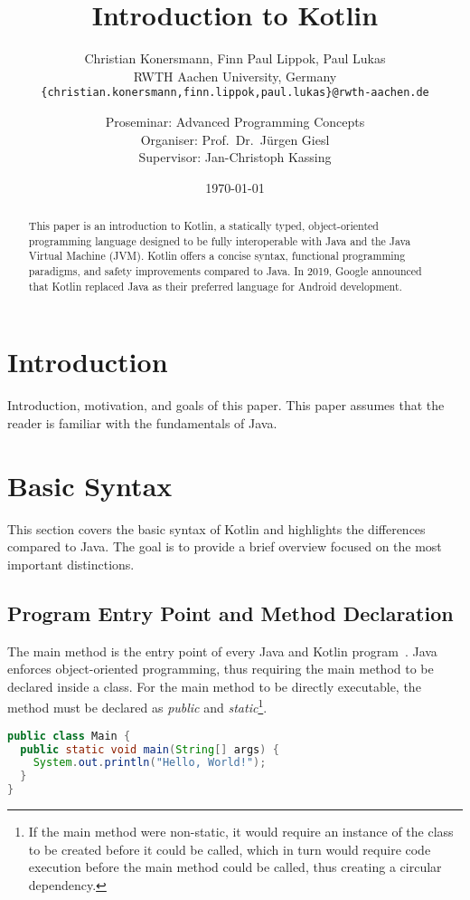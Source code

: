 \documentclass[a4paper, 11pt]{article}
\title{\huge \bfseries Introduction to Kotlin}
\author{
  Christian Konersmann, Finn Paul Lippok, Paul Lukas \\[1ex]
  RWTH Aachen University, Germany \\
  \texttt{\{christian.konersmann,finn.lippok,paul.lukas\}@rwth-aachen.de} \\
  \and
  Proseminar: Advanced Programming Concepts \\
  Organiser: Prof.\ Dr.\ Jürgen Giesl \\
  Supervisor: Jan-Christoph Kassing
}
\date{\today}
\begin{document}
\maketitle

\begin{abstract}
  This paper is an introduction to Kotlin, a statically typed, object-oriented programming language designed to be fully interoperable with Java and the Java Virtual Machine (JVM).
  Kotlin offers a concise syntax, functional programming paradigms, and safety improvements compared to Java. In 2019, Google announced that Kotlin replaced Java as their preferred language for Android development.
\end{abstract}

\section{Introduction}
  Introduction, motivation, and goals of this paper.
  This paper assumes that the reader is familiar with the fundamentals of Java.
\section{Basic Syntax}
This section covers the basic syntax of Kotlin and highlights the differences compared to Java.
The goal is to provide a brief overview focused on the most important distinctions.

\subsection{Program Entry Point and Method Declaration}
The main method is the entry point of every Java and Kotlin program~\cite{program-entry-point}.
Java enforces object-oriented programming, thus requiring the main method to be declared inside a class.
For the main method to be directly executable, the method must be declared as \textit{public} and \textit{static}\footnote{If the main method were non-static, it would require an instance of the class to be created before it could be called, which in turn would require code execution before the main method could be called, thus creating a circular dependency.}.

\begin{lstlisting}[language=Java,title={Java main method}]
public class Main {
  public static void main(String[] args) {
    System.out.println("Hello, World!");
  }
}
\end{lstlisting}
\end{document}
